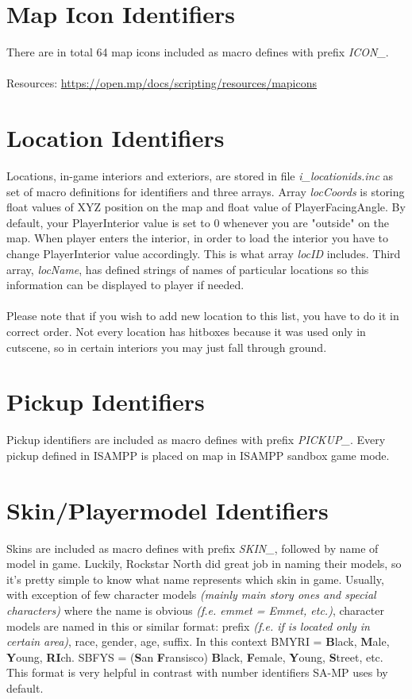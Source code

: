 \documentclass{article}
\begin{document}
\section{Map Icon Identifiers}
There are in total 64 map icons included as macro defines with prefix \textit{ICON\_}.
\\
\\Resources: \url{https://open.mp/docs/scripting/resources/mapicons}


\section{Location Identifiers}
Locations, in-game interiors and exteriors, are stored in file \textit{i\_locationids.inc} as set of macro definitions for identifiers and three arrays. Array \textit{locCoords} is storing float values of XYZ position on the map and float value of PlayerFacingAngle. By default, your PlayerInterior value is set to 0 whenever you are "outside" on the map. When player enters the interior, in order to load the interior you have to change PlayerInterior value accordingly. This is what array \textit{locID} includes. Third array, \textit{locName}, has defined strings of names of particular locations so this information can be displayed to player if needed.\\
\\
Please note that if you wish to add new location to this list, you have to do it in correct order. Not every location has hitboxes because it was used only in cutscene, so in certain interiors you may just fall through ground.

\section{Pickup Identifiers}
Pickup identifiers are included as macro defines with prefix \textit{PICKUP\_}. Every pickup defined in ISAMPP is placed on map in ISAMPP sandbox game mode.

\section{Skin/Playermodel Identifiers}
Skins are included as macro defines with prefix \textit{SKIN\_}, followed by name of model in game. Luckily, Rockstar North did great job in naming their models, so it's pretty simple to know what name represents which skin in game. Usually, with exception of few character models \textit{(mainly main story ones and special characters)} where the name is obvious \textit{(f.e. emmet = Emmet, etc.)}, character models are named in this or similar format: prefix \textit{(f.e. if is located only in certain area)}, race, gender, age, suffix. In this context BMYRI = \textbf{B}lack, \textbf{M}ale, \textbf{Y}oung, \textbf{RI}ch. SBFYS = (\textbf{S}an \textbf{F}ransisco) \textbf{B}lack, \textbf{F}emale, \textbf{Y}oung, \textbf{S}treet, etc. This format is very helpful in contrast with number identifiers SA-MP uses by default.
\end{document}
